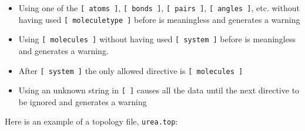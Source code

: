 \begin{itemize}
\item Using one of the {\tt [~atoms~]}, {\tt [~bonds~]},
      {\tt [~pairs~]}, {\tt [~angles~]}, etc. without having used
      {\tt [~moleculetype~]}
      before is meaningless and generates a warning
\item Using {\tt [~molecules~]} without having used
      {\tt [~system~]} before is meaningless and generates a warning.
\item After {\tt [~system~]} the only allowed directive is {\tt [~molecules~]}
\item Using an unknown string in {\tt [ ]} causes all the data until
      the next directive to be ignored and generates a warning
\end{itemize}

Here is an example of a topology file, {\tt urea.top}:


